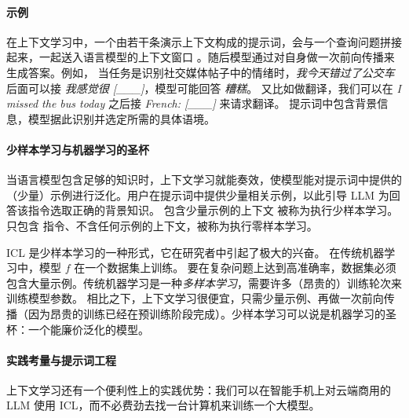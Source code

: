 \paragraph{示例}
在上下文学习中，一个由若干条演示上下文构成的提示词，会与一个查询问题拼接起来，一起送入语言模型的上下文窗口 \citep{liu2023pre}。随后模型通过对自身做一次前向传播来生成答案。例如，
当任务是识别社交媒体帖子中的情绪时，{\em 我今天错过了公交车}后面可以接 {\em 我感觉很 [\_\_\_]}，模型可能回答 {\em 糟糕}。
%
又比如做翻译，我们可以在 {\em I missed the bus today} 之后接
{\em French: [\_\_\_]} 来请求翻译。
提示词中包含背景信息，模型据此识别并选定所需的具体语境。

\paragraph{少样本学习与机器学习的圣杯}
当语言模型包含足够的知识时，上下文学习就能奏效，使模型能对提示词中提供的（少量）示例进行泛化。用户在提示词中提供少量相关示例，以此引导 LLM 为回答该指令选取正确的背景知识。
%
包含少量示例的上下文
被称为执行少样本学习。只包含
指令、不含任何示例的上下文，被称为执行零样本学习。

ICL 是少样本学习的一种形式，它在研究者中引起了极大的兴奋。
在传统机器学习中，模型 $f$ 在一个数据集上训练。
要在复杂问题上达到高准确率，数据集必须包含大量示例。传统机器学习是一种{\em 多样本学习}，需要许多（昂贵的）训练轮次来训练模型参数。
相比之下，上下文学习很便宜，只需少量示例、再做一次前向传播（因为昂贵的训练已经在预训练阶段完成）。少样本学习可以说是机器学习的圣杯：一个能廉价泛化的模型。




\paragraph{实践考量与提示词工程}
上下文学习还有一个便利性上的实践优势：我们可以在智能手机上对云端商用的 LLM 使用 ICL，而不必费劲去找一台计算机来训练一个大模型。


